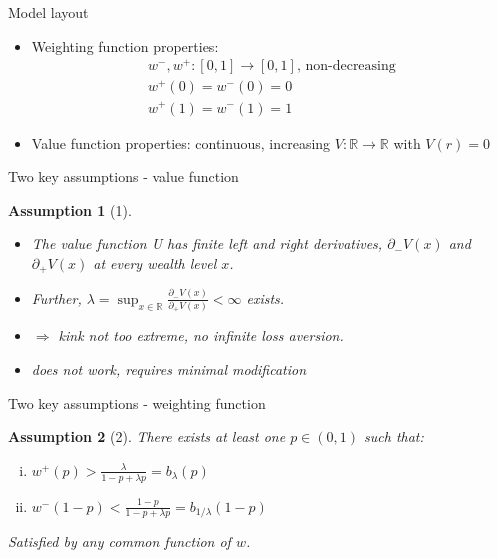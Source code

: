 \documentclass[11pt, aspectratio=169]{beamer}
\newtheorem{assumption}{Assumption}
\begin{document}
\begin{frame}{Model layout}
    \begin{itemize}
    \item Weighting function properties:
    \begin{align*}
        w^-,w^+:[0,1] \rightarrow [0,1],\, \text{non-decreasing}\\
        w^+(0) = w^-(0) = 0\\
        w^+(1) = w^-(1) = 1
    \end{align*}
    \item Value function properties: continuous, increasing $V:\mathbb{R} \rightarrow \mathbb{R}$ with $V(r) = 0$\medskip
\end{itemize}
\end{frame}

\begin{frame}{Two key assumptions - value function}
    \begin{assumption}[1]
    \begin{itemize}
        \item The value function U has finite left and right derivatives,
       $\partial _-V(x)$ and $\partial _+V(x)$ at every wealth level $x$.\medskip
        \item Further, $\lambda = \sup _{x\in \mathbb{R} } \frac{\partial _-V(x)}{\partial _+V(x)} < \infty$ exists.\medskip
        \item $\Rightarrow$ kink not too extreme, no infinite loss aversion.\medskip
        \item \citep{KahnemanTversky1979} does not work, requires minimal modification\medskip
    \end{itemize}
\end{assumption}
\end{frame}

\begin{frame}{Two key assumptions - weighting function}
\begin{assumption}[2]
    There exists at least one $p \in (0,1)$ such that:\medskip
    \begin{enumerate}[(i)]
        \item $w^+(p)> \frac{\lambda}{1-p+\lambda p} = b_{\lambda}(p)$ \medskip
        \item $w^-(1-p)< \frac{1-p}{1-p+\lambda p} = b_{1/\lambda}(1-p)$  \medskip
	\end{enumerate}
    Satisfied by any common function of $w$.
\end{assumption}
\end{frame}
\end{document}
